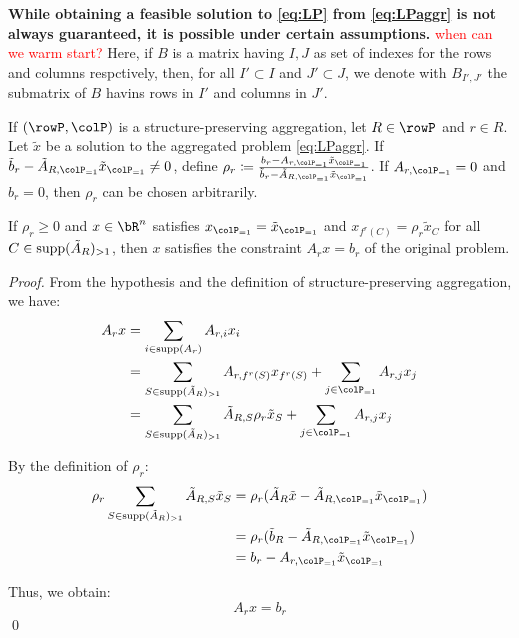 {\textbf{While obtaining a feasible solution to \eqref{eq:LP} from \eqref{eq:LPaggr} is not always guaranteed, it is possible under certain assumptions.}
\textcolor{red}{when can we warm start?} Here, if \(B\) is a matrix having \(I,J\) as set of indexes for the rows and columns respctively, then, for all \(I' \subset I\) and \(J' \subset J\), we denote with \(B_{I',J'}\) the submatrix of \(B\) havins rows in \(I'\) and columns in \(J'\).
\begin{observation}
\label{ob:aggrconstr}
If \((\rowP, \colP)\) is a structure-preserving aggregation, let \(R \in \rowP\) and \(r \in R\). Let \(\tilde{x}\) be a solution to the aggregated problem \eqref{eq:LPaggr}. If \(\tilde{b}_r - \tilde{A}_{R, \colP_{=1}} \tilde{x}_{\colP_{=1}} \neq 0\), define \(\rho_r \coloneqq \frac{b_r - A_{r, \colP_{=1}} \tilde{x}_{\colP_{=1}}}{\tilde{b}_r
 - \tilde{A}_{R, \colP_{=1}} \tilde{x}_{\colP_{=1}}}\). If \(A_{r, \colP_{=1}} = 0\) and \(b_r = 0\), then \(\rho_r\) can be chosen arbitrarily. 

If \(\rho_r \geq 0\) and \(x \in \bR^n\) satisfies \(x_{\colP_{=1}} = \tilde{x}_{\colP_{=1}}\) and \(x_{f^r(C)} = \rho_r \tilde{x}_C\) for all \(C \in \operatorname{supp}(\tilde{A}_R)_{>1}\), then \(x\) satisfies the constraint \(A_r x = b_r\) of the original problem.
\end{observation}

\begin{proof}
From the hypothesis and the definition of structure-preserving aggregation, we have:
\begin{align*}
A_r x &= \sum_{i \in \supp(A_r)} A_{r,i} x_i \\
&= \sum_{S \in \supp(\tilde{A}_R)_{>1}} A_{r,f^r(S)} x_{f^r(S)} + 
\sum_{j \in \colP_{=1}} A_{r,j} x_j \\
&= \sum_{S \in \supp(\tilde{A}_R)_{>1}} \tilde{A}_{R,S} \rho_r \tilde{x}_S + 
\sum_{j \in \colP_{=1}} A_{r,j} x_j
\end{align*}

By the definition of \(\rho_r\):
\begin{align*}
\rho_r \sum_{S \in \supp(\tilde{A}_R)_{>1}} \tilde{A}_{R,S} \tilde{x}_S 
&= \rho_r (\tilde{A}_R \tilde{x} - \tilde{A}_{R,\colP_{=1}} \tilde{x}_{\colP_{=1}}) \\
&= \rho_r (\tilde{b}_R - \tilde{A}_{R,\colP_{=1}} \tilde{x}_{\colP_{=1}}) \\
&= b_r - A_{r, \colP_{=1}} \tilde{x}_{\colP_{=1}}
\end{align*}

Thus, we obtain:
\[
A_r x = b_r
\]
\qed
\end{proof}

}
